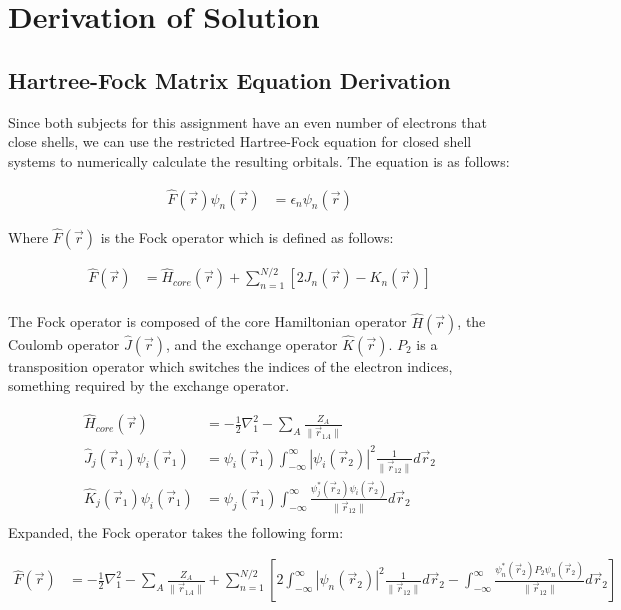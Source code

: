 \documentclass[10pt, oneside, letterpaper]{article}
\begin{document}
\section{Derivation of Solution}

\subsection{Hartree-Fock Matrix Equation Derivation}

Since both subjects for this assignment have an even number of electrons that close shells, we can use the restricted Hartree-Fock equation for closed shell systems to numerically calculate the resulting orbitals. The equation is as follows:

\begin{align*}
  \hat{F}(\vec{r})\psi_n(\vec{r}) &= \epsilon_n\psi_n(\vec{r})
\end{align*}

Where $\hat{F}(\vec{r})$ is the Fock operator which is defined as follows:

\begin{align*}
  \hat{F}(\vec{r}) &= \hat{H}_{core}(\vec{r}) + \sum_{n=1}^{N/2}\left[2J_n(\vec{r}) - K_n(\vec{r})\right]\\
\end{align*}

The Fock operator is composed of the core Hamiltonian operator $\hat{H}(\vec{r})$, the Coulomb operator $\hat{J}(\vec{r})$, and the exchange operator $\hat{K}(\vec{r})$. $P_2$ is a transposition operator which switches the indices of the electron indices, something required by the exchange operator.

\begin{align*}
  \hat{H}_{core}(\vec{r}) &= -\frac{1}{2}\nabla_1^2 - \sum_A\frac{Z_A}{\|\vec{r}_{1 A}\|}\\
  \hat{J}_j(\vec{r}_1)\psi_i(\vec{r}_1) &= \psi_i(\vec{r}_1)\int_{-\infty}^{\infty}\left|\psi_i(\vec{r}_2)\right|^2\frac{1}{\|\vec{r}_{12}\|}d\vec{r}_2 \\
  \hat{K}_j(\vec{r}_1)\psi_i(\vec{r}_1) &= \psi_j(\vec{r}_1)\int_{-\infty}^{\infty}\frac{\psi_j^\ast(\vec{r}_2)\psi_i(\vec{r}_2)}{\|\vec{r}_{12}\|}d\vec{r}_2 \\
\end{align*}
Expanded, the Fock operator takes the following form:

\begin{align*}
  \hat{F}(\vec{r}) &= -\frac{1}{2}\nabla_1^2 - \sum_A\frac{Z_A}{\|\vec{r}_{1 A}\|} + \sum_{n=1}^{N/2}\left[2\int_{-\infty}^{\infty}\left|\psi_n(\vec{r}_2)\right|^2\frac{1}{\|\vec{r}_{12}\|}d\vec{r}_2 - \int_{-\infty}^{\infty}\frac{\psi_n^\ast(\vec{r}_2)P_2\psi_n(\vec{r}_2)}{\|\vec{r}_{12}\|}d\vec{r}_2\right]
\end{align*}
\end{document}
